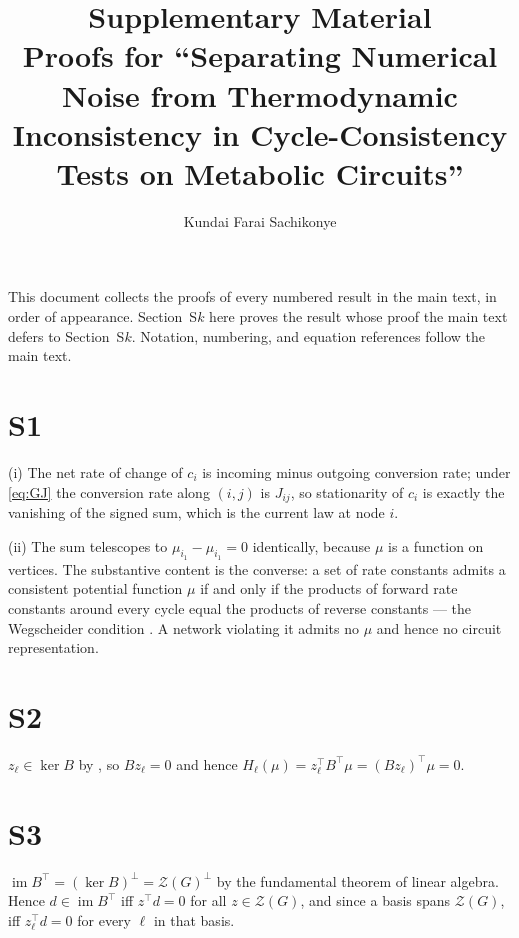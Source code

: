\documentclass[11pt,a4paper]{article}
\title{Supplementary Material\\[4pt]
\large Proofs for ``Separating Numerical Noise from Thermodynamic
Inconsistency in Cycle-Consistency Tests on Metabolic Circuits''}
\author{Kundai Farai Sachikonye}
\date{}
\theoremstyle{definition}
\theoremstyle{remark}
\newcommand{\hol}{H}
\begin{document}
\maketitle

\noindent
This document collects the proofs of every numbered result in the main
text, in order of appearance. Section~S$k$ here proves the result whose
proof the main text defers to Section~S$k$. Notation, numbering, and
equation references follow the main text.

\section*{S1}
(i) The net rate of change of $c_i$ is incoming minus outgoing
conversion rate; under \eqref{eq:GJ} the conversion rate along $(i,j)$
is $J_{ij}$, so stationarity of $c_i$ is exactly the vanishing of the
signed sum, which is the current law at node $i$.

(ii) The sum telescopes to $\mu_{i_1}-\mu_{i_1}=0$ identically, because
$\mu$ is a function on vertices. The substantive content is the
converse: a set of rate constants admits a consistent potential function
$\mu$ if and only if the products of forward rate constants around every
cycle equal the products of reverse constants --- the Wegscheider
condition \citep{wegscheider1901,schuster1989}. A network violating it
admits no $\mu$ and hence no circuit representation.

\section*{S2}
$z_\ell\in\ker B$ by , so
$B z_\ell = 0$ and hence $\hol_\ell(\mu)=z_\ell^{\top}B^{\top}\mu
= (Bz_\ell)^{\top}\mu = 0$.

\section*{S3}
$\operatorname{im}B^{\top} = (\ker B)^{\perp} = \mathcal{Z}(G)^{\perp}$
by the fundamental theorem of linear algebra. Hence $d\in
\operatorname{im}B^{\top}$ iff $z^{\top}d=0$ for all
$z\in\mathcal{Z}(G)$, and since a basis spans $\mathcal{Z}(G)$, iff
$z_\ell^{\top}d=0$ for every $\ell$ in that basis.
\end{document}
